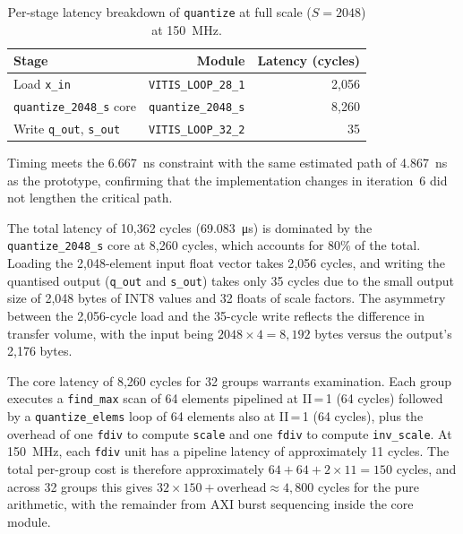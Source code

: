 \begin{table}[H]
  \centering
  \begin{tabular}{lrr}
    \toprule
    Stage & Module & Latency (cycles) \\
    \midrule
    Load \texttt{x\_in}          & \texttt{VITIS\_LOOP\_28\_1}  & 2{,}056 \\
    \texttt{quantize\_2048\_s} core & \texttt{quantize\_2048\_s} & 8{,}260 \\
    Write \texttt{q\_out}, \texttt{s\_out} & \texttt{VITIS\_LOOP\_32\_2} & 35 \\
    \bottomrule
  \end{tabular}
  \caption{Per-stage latency breakdown of \texttt{quantize} at full scale
           ($S = 2048$) at \SI{150}{\mega\hertz}.}
  \label{tab:quantize_u3_latency}
\end{table}

Timing meets the \SI{6.667}{\nano\second} constraint with the same
estimated path of \SI{4.867}{\nano\second} as the prototype, confirming
that the implementation changes in iteration~6 did not lengthen the
critical path.

The total latency of 10{,}362 cycles (\SI{69.083}{\micro\second}) is
dominated by the \texttt{quantize\_2048\_s} core at 8{,}260 cycles,
which accounts for 80\% of the total. Loading the 2{,}048-element input
float vector takes 2{,}056 cycles, and writing the quantised output
(\texttt{q\_out} and \texttt{s\_out}) takes only 35 cycles due to the
small output size of 2{,}048 bytes of INT8 values and 32 floats of scale
factors. The asymmetry between the 2{,}056-cycle load and the 35-cycle
write reflects the difference in transfer volume, with the input being
$2048 \times 4 = 8{,}192$ bytes versus the output's 2{,}176 bytes.

The core latency of 8{,}260 cycles for 32 groups warrants examination.
Each group executes a \texttt{find\_max} scan of 64 elements pipelined
at II\,=\,1 (64 cycles) followed by a \texttt{quantize\_elems} loop
of 64 elements also at II\,=\,1 (64 cycles), plus the overhead of one
\texttt{fdiv} to compute \texttt{scale} and one \texttt{fdiv} to compute
\texttt{inv\_scale}. At \SI{150}{\mega\hertz}, each \texttt{fdiv} unit
has a pipeline latency of approximately 11 cycles. The total per-group
cost is therefore approximately $64 + 64 + 2 \times 11 = 150$ cycles,
and across 32 groups this gives $32 \times 150 + \text{overhead}
\approx 4{,}800$ cycles for the pure arithmetic, with the remainder
from AXI burst sequencing inside the core module.

